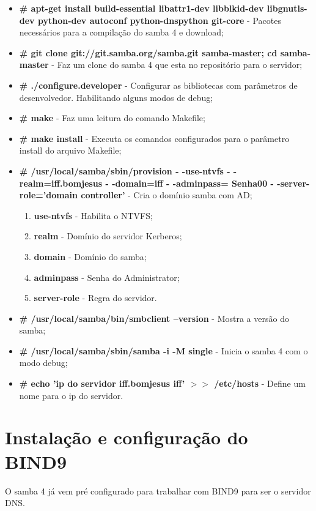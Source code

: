 \begin{itemize}
	\item \textbf{\# apt-get install build-essential libattr1-dev libblkid-dev libgnutls-dev python-dev autoconf python-dnspython git-core} - Pacotes necessários para a compilação do samba 4 e download;
	\item \textbf{\# git clone git://git.samba.org/samba.git samba-master; cd samba-master} - Faz um clone do samba 4 que esta no repositório para o servidor;
	\item \textbf{\# ./configure.developer} - Configurar as bibliotecas com parâmetros de desenvolvedor. Habilitando alguns modos de debug;
	\item \textbf{\# make} - Faz uma leitura do comando Makefile;
	\item \textbf{\# make install} - Executa os comandos configurados para o parâmetro install do arquivo Makefile;
	\item \textbf{\# /usr/local/samba/sbin/provision - -use-ntvfs - -realm=iff.bomjesus - -domain=iff  - -adminpass= Senha00 - -server-role='domain controller'} - Cria o domínio samba com AD;
		\begin{enumerate}
			\item \textbf{use-ntvfs} - Habilita o NTVFS;
			\item \textbf{realm} - Domínio do servidor Kerberos;
			\item \textbf{domain} - Domínio do samba;
			\item \textbf{adminpass} - Senha do Administrator;
			\item \textbf{server-role} - Regra do servidor.
		\end{enumerate}
	\item \textbf{\# /usr/local/samba/bin/smbclient --version} - Mostra a versão do samba;
	\item \textbf{\# /usr/local/samba/sbin/samba -i -M single} - Inicia o samba 4 com o modo debug;
	\item \textbf{\#  echo 'ip do servidor iff.bomjesus iff' $>$$>$ /etc/hosts} - Define um nome para o ip do servidor.
\end{itemize}

\section{Instalação e configuração do BIND9}

O samba 4 já vem pré configurado para trabalhar com BIND9 para ser o servidor DNS.

